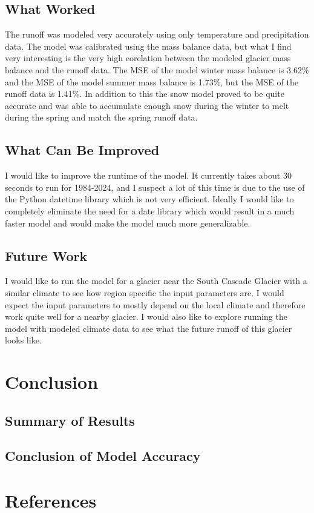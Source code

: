 \documentclass{article}
\begin{document}
\subsection{What Worked}
The runoff was modeled very accurately using only temperature and precipitation data. The model was calibrated using the mass balance data, 
but what I find very interesting is the very high corelation between the modeled glacier mass balance and the runoff data. The MSE of the 
model winter mass balance is 3.62\% and the MSE of the model summer mass balance is 1.73\%, but the MSE of the runoff data is 1.41\%. In 
addition to this the snow model proved to be quite accurate and was able to accumulate enough snow during the winter to melt during the 
spring and match the spring runoff data. 

\subsection{What Can Be Improved}
I would like to improve the runtime of the model. It currently takes about 30 seconds to run for 1984-2024, and I suspect a lot of this time 
is due to the use of the Python datetime library which is not very efficient. Ideally I would like to completely eliminate the need for a date 
library which would result in a much faster model and would make the model much more generalizable.
\subsection{Future Work}
I would like to run the model for a glacier near the South Cascade Glacier with a similar climate to see how region specific the input 
parameters are. I would expect the input parameters to mostly depend on the local climate and therefore work quite well for a nearby glacier. 
I would also like to explore running the model with modeled climate data to see what the future runoff of this glacier looks like.
\section{Conclusion}
\subsection{Summary of Results}
\subsection{Conclusion of Model Accuracy}

\section{References}
\end{document}
